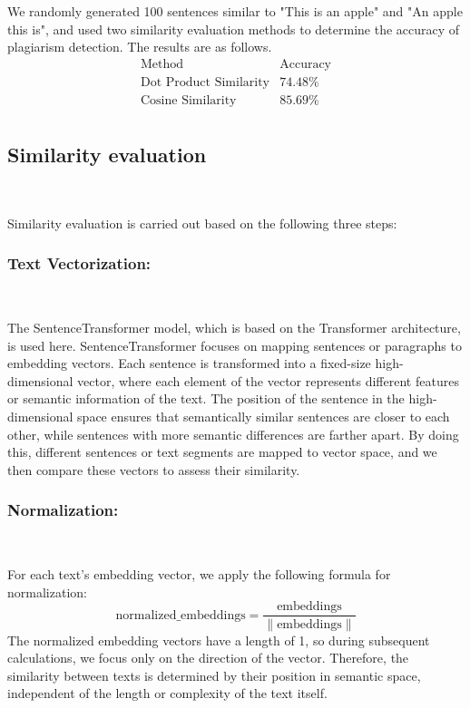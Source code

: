 We randomly generated 100 sentences similar to "This is an apple" and "An apple this is", and used two similarity evaluation methods to determine the accuracy of plagiarism detection. The results are as follows.
\[
\begin{array}{c|c}
\text{Method} & \text{Accuracy} \\
\hline
\text{Dot Product Similarity} & 74.48\% \\
\text{Cosine Similarity} & 85.69\% \\
\end{array}
\]

\subsection{Similarity evaluation}
\

Similarity evaluation is carried out based on the following three steps:
\subsubsection{Text Vectorization:}
\

The SentenceTransformer model, which is based on the Transformer architecture, is used here. SentenceTransformer focuses on mapping sentences or paragraphs to embedding vectors. Each sentence is transformed into a fixed-size high-dimensional vector, where each element of the vector represents different features or semantic information of the text. The position of the sentence in the high-dimensional space ensures that semantically similar sentences are closer to each other, while sentences with more semantic differences are farther apart. By doing this, different sentences or text segments are mapped to vector space, and we then compare these vectors to assess their similarity.

\subsubsection{Normalization:}
\

For each text's embedding vector, we apply the following formula for normalization:  
\[
\text{normalized\_embeddings} = \frac{\text{embeddings}}{\|\text{embeddings}\|}
\]  
The normalized embedding vectors have a length of 1, so during subsequent calculations, we focus only on the direction of the vector. Therefore, the similarity between texts is determined by their position in semantic space, independent of the length or complexity of the text itself.

